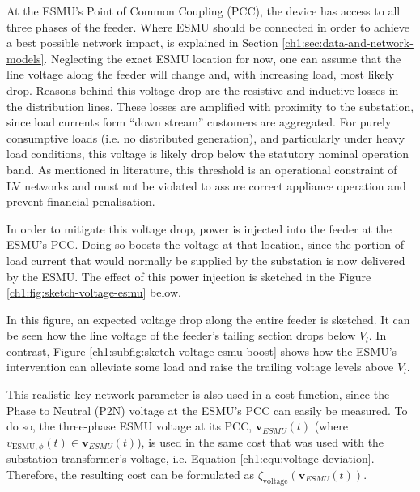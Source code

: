 At the ESMU's Point of Common Coupling (PCC), the device has access to all three phases of the feeder.
Where ESMU should be connected in order to achieve a best possible network impact, is explained in Section \ref{ch1:sec:data-and-network-models}.
Neglecting the exact ESMU location for now, one can assume that the line voltage along the feeder will change and, with increasing load, most likely drop.
Reasons behind this voltage drop are the resistive and inductive losses in the distribution lines.
These losses are amplified with proximity to the substation, since load currents form ``down stream'' customers are aggregated.
For purely consumptive loads (i.e. no distributed generation), and particularly under heavy load conditions, this voltage is likely drop below the statutory nominal operation band.
As mentioned in literature, this threshold is an operational constraint of LV networks and must not be violated to assure correct appliance operation and prevent financial penalisation.

In order to mitigate this voltage drop, power is injected into the feeder at the ESMU's PCC.
Doing so boosts the voltage at that location, since the portion of load current that would normally be supplied by the substation is now delivered by the ESMU.
The effect of this power injection is sketched in the Figure \ref{ch1:fig:sketch-voltage-esmu} below.




In this figure, an expected voltage drop along the entire feeder is sketched. 
It can be seen how the line voltage of the feeder's tailing section drops below $V_l$.
In contrast, Figure \ref{ch1:subfig:sketch-voltage-esmu-boost} shows how the ESMU's intervention can alleviate some load and raise the trailing voltage levels above $V_l$.

This realistic key network parameter is also used in a cost function, since the Phase to Neutral (P2N) voltage at the ESMU's PCC can easily be measured.
To do so, the three-phase ESMU voltage at its PCC, $\textbf{v}_{ESMU}(t)$ (where $v_{\text{ESMU},\phi}(t) \in \textbf{v}_{ESMU}(t)$), is used in the same cost that was used with the substation transformer's voltage, i.e. Equation \ref{ch1:equ:voltage-deviation}.
Therefore, the resulting cost can be formulated as $\zeta_\text{voltage}(\textbf{v}_{ESMU}(t))$.

